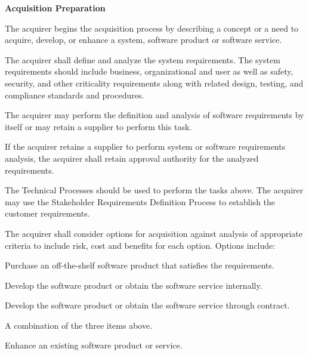 			\begin{adjustwidth}{2em}{0pt}

				\begin{compactenum}

					\item {\bf Acquisition Preparation}

					\begin{compactenum}
						\item The acquirer begins the acquisition process by describing a concept or a need to acquire, develop, or enhance a system, software product or software service.

						\item The acquirer shall define and analyze the system requirements. The system requirements should include business, organizational and user as well as safety, security, and other criticality requirements along with related design, testing, and compliance standards and procedures.

						\item The acquirer may perform the definition and analysis of software requirements by itself or may retain a supplier to perform this task.

						\item If the acquirer retains a supplier to perform system or software requirements analysis, the acquirer shall retain approval authority for the analyzed requirements.

						\item The Technical Processes should be used to perform the tasks above. The acquirer may use the Stakeholder Requirements Definition Process to establish the customer requirements.

						\item The acquirer shall consider options for acquisition against analysis of appropriate criteria to include risk, cost and benefits for each option. Options include:

						\begin{compactitem}
							\item Purchase an off-the-shelf software product that satisfies the requirements.
							\item Develop the software product or obtain the software service internally.
							\item Develop the software product or obtain the software service through contract.
							\item A combination of the three items above.
							\item Enhance an existing software product or service.
						\end{compactitem}


\end{compactenum}
\end{compactenum}
\end{adjustwidth}
